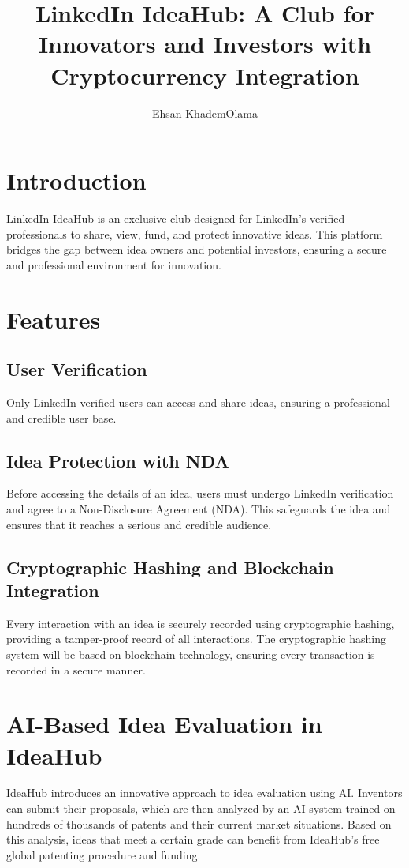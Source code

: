 \documentclass{article}
\title{LinkedIn IdeaHub: A Club for Innovators and Investors with Cryptocurrency Integration}
\author{Ehsan KhademOlama }
\begin{document}
	\maketitle
	\tableofcontents
	\newpage
	
	\section{Introduction}
	LinkedIn IdeaHub is an exclusive club designed for LinkedIn's verified professionals to share, view, fund, and protect innovative ideas. This platform bridges the gap between idea owners and potential investors, ensuring a secure and professional environment for innovation.
	
	\section{Features}
	\subsection{User Verification}
	Only LinkedIn verified users can access and share ideas, ensuring a professional and credible user base.
	
	\subsection{Idea Protection with NDA}
	Before accessing the details of an idea, users must undergo LinkedIn verification and agree to a Non-Disclosure Agreement (NDA). This safeguards the idea and ensures that it reaches a serious and credible audience.
	
	\subsection{Cryptographic Hashing and Blockchain Integration}
	Every interaction with an idea is securely recorded using cryptographic hashing, providing a tamper-proof record of all interactions. The cryptographic hashing system will be based on blockchain technology, ensuring every transaction is recorded in a secure manner.

	\section{AI-Based Idea Evaluation in IdeaHub}
	IdeaHub introduces an innovative approach to idea evaluation using AI. Inventors can submit their proposals, which are then analyzed by an AI system trained on hundreds of thousands of patents and their current market situations. Based on this analysis, ideas that meet a certain grade can benefit from IdeaHub's free global patenting procedure and funding.
	
\end{document}
